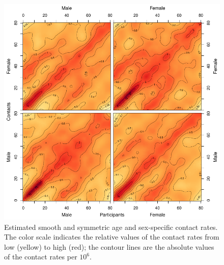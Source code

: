\documentclass[aoas,preprint]{imsart}
\numberwithin{equation}{section}
\begin{document}
\begin{figure}
\centering
\includegraphics{fig_contact_matrix_smooth.pdf}
\caption{Estimated smooth and symmetric age and sex-specific contact rates. The color scale indicates the relative values of the contact rates from low (yellow) to high (red); the contour lines are the absolute values of the contact rates per $10^6$.}
\label{fig:3}
\end{figure}
\end{document}

